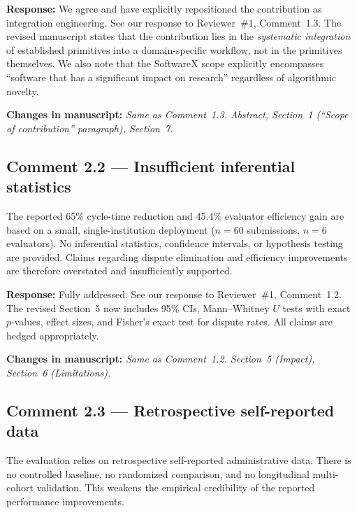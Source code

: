 \documentclass[11pt,a4paper]{article}
\newcommand{\response}[1]{\par\noindent\textcolor{responsecolor}{\textbf{Response:}} #1}
\newcommand{\change}[1]{\par\noindent\textcolor{changecolor}{\textbf{Changes in manuscript:}} \textit{#1}}
\begin{document}
\response{We agree and have explicitly repositioned the contribution as integration engineering. See our response to Reviewer~\#1, Comment~1.3. The revised manuscript states that the contribution lies in the \emph{systematic integration} of established primitives into a domain-specific workflow, not in the primitives themselves. We also note that the SoftwareX scope explicitly encompasses ``software that has a significant impact on research'' regardless of algorithmic novelty.}

\change{Same as Comment~1.3. Abstract, Section~1 (``Scope of contribution'' paragraph), Section~7.}

\bigskip

\subsection*{Comment 2.2 --- Insufficient inferential statistics}

\begin{reviewerbox}
The reported 65\% cycle-time reduction and 45.4\% evaluator efficiency gain are based on a small, single-institution deployment ($n=60$ submissions, $n=6$ evaluators). No inferential statistics, confidence intervals, or hypothesis testing are provided. Claims regarding dispute elimination and efficiency improvements are therefore overstated and insufficiently supported.
\end{reviewerbox}

\response{Fully addressed. See our response to Reviewer~\#1, Comment~1.2. The revised Section~5 now includes 95\% CIs, Mann--Whitney $U$ tests with exact $p$-values, effect sizes, and Fisher's exact test for dispute rates. All claims are hedged appropriately.}

\change{Same as Comment~1.2. Section~5 (Impact), Section~6 (Limitations).}

\bigskip

\subsection*{Comment 2.3 --- Retrospective self-reported data}

\begin{reviewerbox}
The evaluation relies on retrospective self-reported administrative data. There is no controlled baseline, no randomized comparison, and no longitudinal multi-cohort validation. This weakens the empirical credibility of the reported performance improvements.
\end{reviewerbox}
\end{document}
